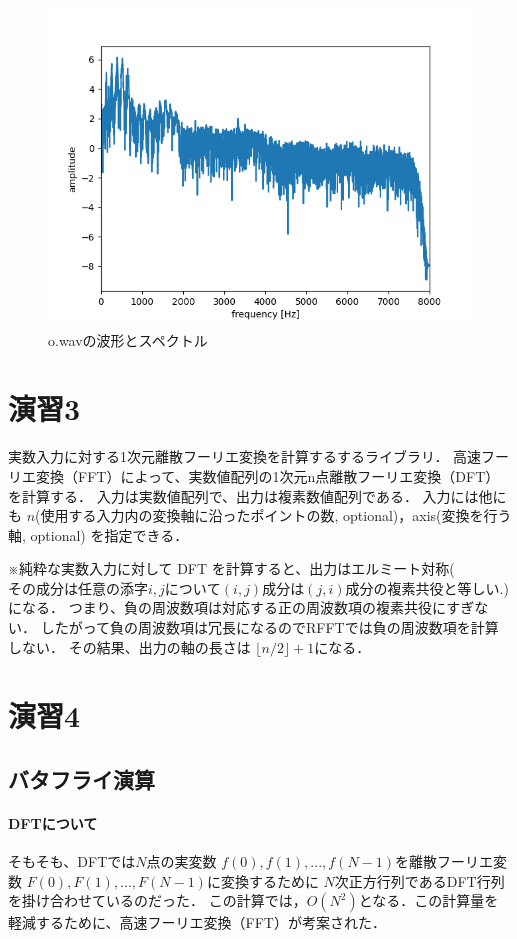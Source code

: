 \documentclass[11pt,a4j]{jarticle}%
\begin{document}
\begin{figure}[H]
  \centering
  \includegraphics[width=120mm]{img/o-plot-spectrum-whole.png}
  \caption{o.wavの波形とスペクトル}
\end{figure}

\section*{演習3}
実数入力に対する1次元離散フーリエ変換を計算するするライブラリ．
高速フーリエ変換（FFT）によって、実数値配列の1次元n点離散フーリエ変換（DFT）を計算する．
入力は実数値配列で、出力は複素数値配列である．
入力には他にも $n$(使用する入力内の変換軸に沿ったポイントの数, optional)，axis(変換を行う軸, optional) を指定できる．

※純粋な実数入力に対して DFT を計算すると、出力はエルミート対称($その成分は任意の添字 i, j について (i, j)成分は (j, i)成分の複素共役と等しい.$)になる．
つまり、負の周波数項は対応する正の周波数項の複素共役にすぎない．
したがって負の周波数項は冗長になるのでRFFTでは負の周波数項を計算しない．
その結果、出力の軸の長さは $\lfloor n/2 \rfloor+ 1
$になる．
\section*{演習4}
\subsection*{バタフライ演算}
\paragraph*{DFTについて}
そもそも、DFTでは$N$点の実変数 $f(0),f(1), ... ,f(N-1)$を離散フーリエ変数 $F(0),F(1), ... ,F(N-1)$に変換するために
$N$次正方行列であるDFT行列を掛け合わせているのだった．
この計算では，$O(N^2)$となる．この計算量を軽減するために、高速フーリエ変換（FFT）が考案された． 
\end{document}

